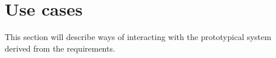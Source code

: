 \section{Use cases}\label{sec:usecases}

This section will describe ways of interacting with the prototypical system derived from the requirements.



